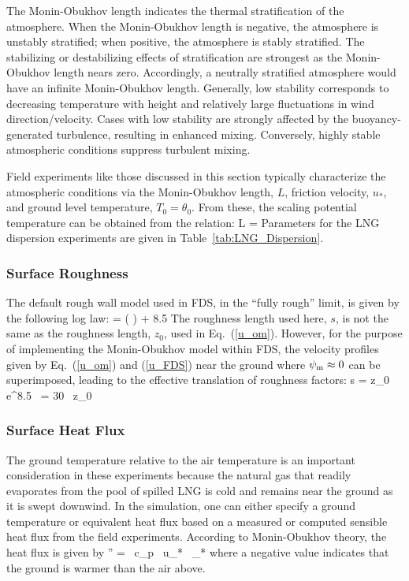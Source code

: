 The Monin-Obukhov length indicates the thermal stratification of the atmosphere.  When the Monin-Obukhov length is negative, the atmosphere is unstably stratified; when positive, the atmosphere is stably stratified.  The stabilizing or destabilizing effects of stratification are strongest as the Monin-Obukhov length nears zero.  Accordingly, a neutrally stratified atmosphere would have an infinite Monin-Obukhov length. Generally, low stability corresponds to decreasing temperature with height and relatively large fluctuations in wind direction/velocity. Cases with low stability are strongly affected by the buoyancy-generated turbulence, resulting in enhanced mixing.  Conversely, highly stable atmospheric conditions suppress turbulent mixing.

Field experiments like those discussed in this section typically characterize the atmospheric conditions via the Monin-Obukhov length, $L$, friction velocity, $u_*$, and ground level temperature, $T_0=\theta_0$. From these, the scaling potential temperature can be obtained from the relation:
\be
   L = 
\ee
Parameters for the LNG dispersion experiments are given in Table~\ref{tab:LNG_Dispersion}.

\subsubsection{Surface Roughness}

The default rough wall model used in FDS, in the ``fully rough'' limit, is given by the following log law:
\be
    =  \ln \left(  \right) + 8.5  \label{u_FDS}
\ee
The roughness length used here, $s$, is not the same as the roughness length, $z_0$, used in Eq.~(\ref{u_om}). However, for the purpose of implementing the Monin-Obukhov model within FDS, the velocity profiles given by Eq.~(\ref{u_om}) and (\ref{u_FDS}) near the ground where $\psi_{\rm m} \approx 0$ can be superimposed, leading to the effective translation of roughness factors:
\be
   s = z_0 \, {\rm e}^{8.5 \, \kappa} = 30 \, z_0
\ee

\subsubsection{Surface Heat Flux}

The ground temperature relative to the air temperature is an important consideration in these experiments because the natural gas that readily evaporates from the pool of spilled LNG is cold and remains near the ground as it is swept downwind. In the simulation, one can either specify a ground temperature or equivalent heat flux based on a measured or computed sensible heat flux from the field experiments. According to Monin-Obukhov theory, the heat flux is given by
\be
   '' = \rho \, c_p \, u_* \, \theta_*
\ee
where a negative value indicates that the ground is warmer than the air above.


